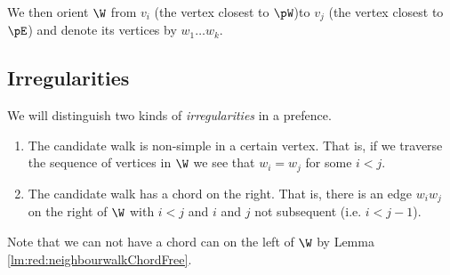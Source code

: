   We then orient $\W$ from $v_i$ (the vertex closest to $\pW$)to $v_j$ (the vertex closest to $\pE$) and denote its vertices by $w_1 \ldots w_k$.

\subsection{Irregularities}
  We will distinguish two kinds of \emph{irregularities} in a prefence.
  \begin{enumerate}
    \item The candidate walk is non-simple in a certain vertex. That is, if we traverse the sequence of vertices in $\W$ we see that $w_i = w_j$ for some $i<j$.
    \item The candidate walk has a chord on the right. That is, there is an edge $w_i w_j$ on the right of $\W$ with $i<j$ and $i$ and $j$ not subsequent (i.e. $i < j-1$).
  \end{enumerate}

  Note that we can not have a chord can on the left of $\W$ by Lemma \ref{lm:red:neighbourwalkChordFree}.


